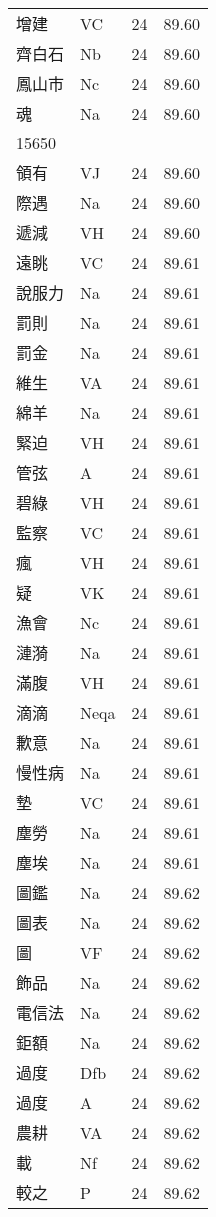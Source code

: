 \documentclass[twocolumn]{book}
\begin{document}
\begin{supertabular}{llrr}
增建 & VC & 24 &  89.60\\
齊白石 & Nb & 24 &  89.60\\
鳳山市 & Nc & 24 &  89.60\\
魂 & Na & 24 &  89.60\\
15650\\
領有 & VJ & 24 &  89.60\\
際遇 & Na & 24 &  89.60\\
遞減 & VH & 24 &  89.60\\
遠眺 & VC & 24 &  89.61\\
說服力 & Na & 24 &  89.61\\
罰則 & Na & 24 &  89.61\\
罰金 & Na & 24 &  89.61\\
維生 & VA & 24 &  89.61\\
綿羊 & Na & 24 &  89.61\\
緊迫 & VH & 24 &  89.61\\
管弦 & A & 24 &  89.61\\
碧綠 & VH & 24 &  89.61\\
監察 & VC & 24 &  89.61\\
瘋 & VH & 24 &  89.61\\
疑 & VK & 24 &  89.61\\
漁會 & Nc & 24 &  89.61\\
漣漪 & Na & 24 &  89.61\\
滿腹 & VH & 24 &  89.61\\
滴滴 & Neqa & 24 &  89.61\\
歉意 & Na & 24 &  89.61\\
慢性病 & Na & 24 &  89.61\\
墊 & VC & 24 &  89.61\\
塵勞 & Na & 24 &  89.61\\
塵埃 & Na & 24 &  89.61\\
圖鑑 & Na & 24 &  89.62\\
圖表 & Na & 24 &  89.62\\
圖 & VF & 24 &  89.62\\
飾品 & Na & 24 &  89.62\\
電信法 & Na & 24 &  89.62\\
鉅額 & Na & 24 &  89.62\\
過度 & Dfb & 24 &  89.62\\
過度 & A & 24 &  89.62\\
農耕 & VA & 24 &  89.62\\
載 & Nf & 24 &  89.62\\
較之 & P & 24 &  89.62\\

\end{supertabular}
\end{document}
